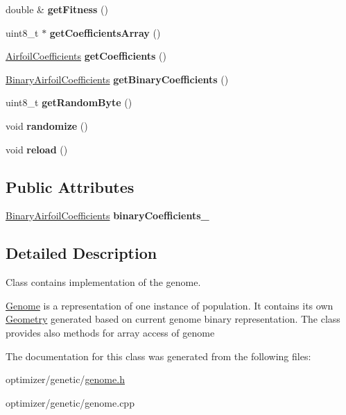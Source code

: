 \begin{DoxyCompactItemize}
double \& {\bfseries get\+Fitness} ()
\item 
\mbox{\label{class_genome_a6969cbfb886eb9a3508b4c2c0ea6ff05}} 
uint8\+\_\+t $\ast$ {\bfseries get\+Coefficients\+Array} ()
\item 
\mbox{\label{class_genome_ac12d4227a6f8c923c7f65d760cdeac35}} 
\hyperlink{struct_airfoil_coefficients}{Airfoil\+Coefficients} {\bfseries get\+Coefficients} ()
\item 
\mbox{\label{class_genome_a1eb60345de5968a454d3868e66bd2773}} 
\hyperlink{struct_binary_airfoil_coefficients}{Binary\+Airfoil\+Coefficients} {\bfseries get\+Binary\+Coefficients} ()
\item 
\mbox{\label{class_genome_a8599bccee27d2594b0364f011cfe4b3f}} 
uint8\+\_\+t {\bfseries get\+Random\+Byte} ()
\item 
\mbox{\label{class_genome_af7cf0bc049e9a79ec5ef48a3b2b4498e}} 
void {\bfseries randomize} ()
\item 
\mbox{\label{class_genome_ab026e27931513c4e665e5d22f7e482a0}} 
void {\bfseries reload} ()
\end{DoxyCompactItemize}
\subsection*{Public Attributes}
\begin{DoxyCompactItemize}
\item 
\mbox{\label{class_genome_a99b2cd9bd15161e49840ca43c79a9cae}} 
\hyperlink{struct_binary_airfoil_coefficients}{Binary\+Airfoil\+Coefficients} {\bfseries binary\+Coefficients\+\_\+}
\end{DoxyCompactItemize}


\subsection{Detailed Description}
Class contains implementation of the genome. 

\hyperlink{class_genome}{Genome} is a representation of one instance of population. It contains its own \hyperlink{class_geometry}{Geometry} generated based on current genome binary representation. The class provides also methods for array access of genome 

The documentation for this class was generated from the following files\+:\begin{DoxyCompactItemize}
\item 
optimizer/genetic/\hyperlink{genome_8h}{genome.\+h}\item 
optimizer/genetic/genome.\+cpp\end{DoxyCompactItemize}
